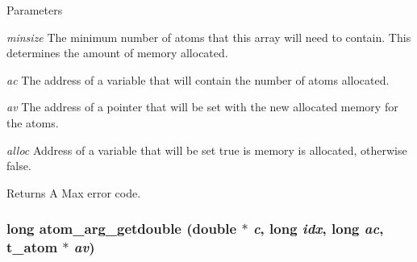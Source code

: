\begin{DoxyParams}{Parameters}
\item[{\em minsize}]The minimum number of atoms that this array will need to contain. This determines the amount of memory allocated. \item[{\em ac}]The address of a variable that will contain the number of atoms allocated. \item[{\em av}]The address of a pointer that will be set with the new allocated memory for the atoms. \item[{\em alloc}]Address of a variable that will be set true is memory is allocated, otherwise false. \end{DoxyParams}
\begin{DoxyReturn}{Returns}
A Max error code. 
\end{DoxyReturn}
\hypertarget{group__atom_ga5f494e92bded5005a52a31738f8cbbdf}{
\subsubsection[{atom\_\-arg\_\-getdouble}]{\setlength{\rightskip}{0pt plus 5cm}long atom\_\-arg\_\-getdouble (double $\ast$ {\em c}, \/  long {\em idx}, \/  long {\em ac}, \/  {\bf t\_\-atom} $\ast$ {\em av})}}
\label{group__atom_ga5f494e92bded5005a52a31738f8cbbdf}


